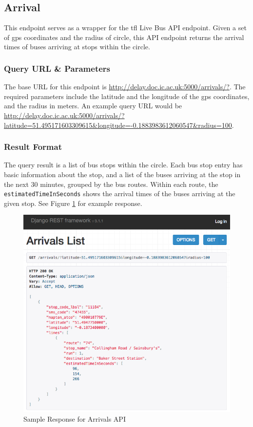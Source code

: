 \subsection{Arrival}
\par This endpoint serves as a wrapper for the \acrshort{tfl} Live Bus API endpoint. Given a set of \acrshort{gps} coordinates and the radius of circle, this API endpoint returns the arrival times of buses arriving at stops within the circle.

\subsubsection{Query URL \& Parameters}
\par The base URL for this endpoint is \url{http://delay.doc.ic.ac.uk:5000/arrivals/?}. The required parameters include the latitude and the longitude of the \acrshort{gps} coordinates, and the radius in meters. An example query URL would be \url{http://delay.doc.ic.ac.uk:5000/arrivals/?latitude=51.495171603309615&longitude=-0.1883983612060547&radius=100}.

\subsubsection{Result Format}
\par The query result is a list of bus stops within the circle. Each bus stop entry has basic information about the stop, and a list of the buses arriving at the stop in the next 30 minutes, grouped by the bus routes. Within each route, the \texttt{estimatedTimeInSeconds} shows the arrival times of the buses arriving at the given stop. See Figure \ref{fig:arrival_api} for example response.


\begin{figure}
\centering
\includegraphics[width=\textwidth]{figures/arrival_api.png}
\caption{\label{fig:arrival_api} Sample Response for Arrivals API}
\end{figure}

